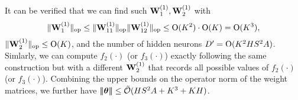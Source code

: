 It can be verified that we can find such ${\mathbf W}_1^{(1)},{\mathbf W}_2^{(1)}$ with $$\|{{\mathbf W}_1^{(1)}}\|_{\mathrm{op}}\leq \|{{\mathbf W}_{11}^{(1)}}\|_{\mathrm{op}}\|{{\mathbf W}_{12}^{(1)}}\|_{\mathrm{op}}\leq {\mathrm{O}}({K}^2)\cdot {\mathrm{O}}({K})={\mathrm{O}}({K}^3),$$ $\|{{\mathbf W}_2^{(1)}}\|_{\mathrm{op}}\leq {\mathrm{O}}({K})
$, and the number of hidden neurons ${D'}={\mathrm{O}}({K}^2{H}{S}^2{A})$. Simlarly, we can compute $f_2(\cdot)$ (or $f_3(\cdot)$) exactly following the same construction but with a different ${\mathbf W}_2^{(1)}$ that records all possible values of  $f_2(\cdot)$ (or $f_3(\cdot)$). Combining the upper bounds on the operator norm of the  weight matrices, we further have ${\left|\!\left|\!\left|{{{\boldsymbol \theta}}}\right|\!\right|\!\right|}\leq{\tilde{\mathcal O}}({H}{S}^2{A}+{K}^3+{K}{H})$.















